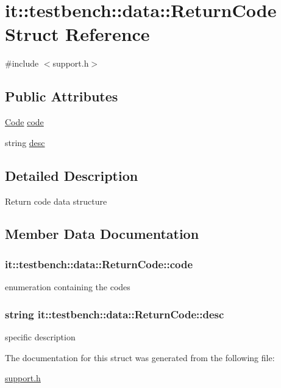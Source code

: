 \hypertarget{structit_1_1testbench_1_1data_1_1ReturnCode}{\section{it\-:\-:testbench\-:\-:data\-:\-:Return\-Code Struct Reference}
\label{dd/d9b/structit_1_1testbench_1_1data_1_1ReturnCode}
}


{\ttfamily \#include $<$support.\-h$>$}

\subsection*{Public Attributes}
\begin{DoxyCompactItemize}
\item 
\hyperlink{namespaceit_1_1testbench_1_1data_a877c419ad91cb12063f1da79551cd8b2}{Code} \hyperlink{structit_1_1testbench_1_1data_1_1ReturnCode_abd000e2c838fe5f8ec2aa7ada199b2d8}{code}
\item 
string \hyperlink{structit_1_1testbench_1_1data_1_1ReturnCode_a221c457c35983053b514eea284bdfcdc}{desc}
\end{DoxyCompactItemize}


\subsection{Detailed Description}
Return code data structure 

\subsection{Member Data Documentation}
\hypertarget{structit_1_1testbench_1_1data_1_1ReturnCode_abd000e2c838fe5f8ec2aa7ada199b2d8}{
\subsubsection[{code}]{ it\-::testbench\-::data\-::\-Return\-Code\-::code}}\label{dd/d9b/structit_1_1testbench_1_1data_1_1ReturnCode_abd000e2c838fe5f8ec2aa7ada199b2d8}
enumeration containing the codes \hypertarget{structit_1_1testbench_1_1data_1_1ReturnCode_a221c457c35983053b514eea284bdfcdc}{
\subsubsection[{desc}]{\setlength{\rightskip}{0pt plus 5cm}string it\-::testbench\-::data\-::\-Return\-Code\-::desc}}\label{dd/d9b/structit_1_1testbench_1_1data_1_1ReturnCode_a221c457c35983053b514eea284bdfcdc}
specific description 

The documentation for this struct was generated from the following file\-:\begin{DoxyCompactItemize}
\item 
\hyperlink{support_8h}{support.\-h}\end{DoxyCompactItemize}
